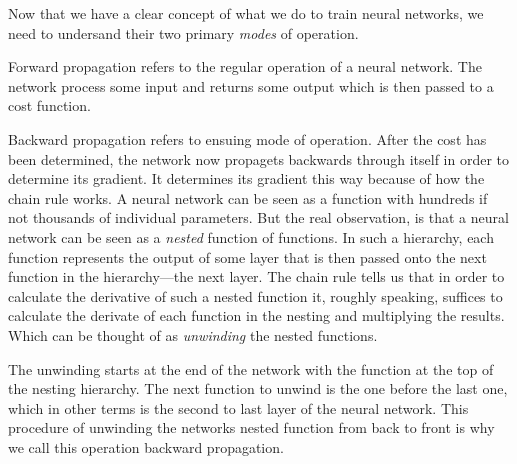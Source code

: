 Now that we have a clear concept of what we do to train neural networks, we need to undersand their two primary {\em modes} of operation.

Forward propagation refers to the regular operation of a neural network.
The network process some input and returns some output which is then passed to a cost function.

Backward propagation refers to ensuing mode of operation.
After the cost has been determined, the network now propagets backwards through itself in order to determine its gradient.
It determines its gradient this way because of how the chain rule works.
A neural network can be seen as a function with hundreds if not thousands of individual parameters.
But the real observation, is that a neural network can be seen as a {\em nested} function of functions.
In such a hierarchy, each function represents the output of some layer that is then passed onto the next function in the hierarchy---the next layer.
The chain rule tells us that in order to calculate the derivative of such a nested function it, roughly speaking, suffices to calculate the derivate of each function in the nesting and multiplying the results.
Which can be thought of as {\em unwinding} the nested functions.

The unwinding starts at the end of the network with the function at the top of the nesting hierarchy.
The next function to unwind is the one before the last one, which in other terms is the second to last layer of the neural network.
This procedure of unwinding the networks nested function from back to front is why we call this operation backward propagation.

\startplacefigure[
    title={Forward propagation and backward propagation \cite[agarwal_2017].},
    location=bottom,
]
\stopplacefigure